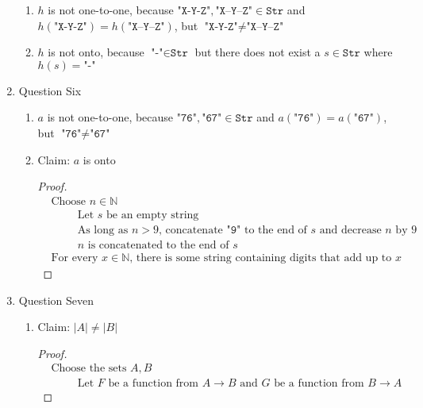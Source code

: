 \documentclass{article}
\begin{document}
\begin{enumerate}
\begin{enumerate}
        \item $h$ is not one-to-one, because $\texttt{"X-Y-Z"}, \texttt{"X--Y--Z"} \in \texttt{Str}$ and $h(\texttt{"X-Y-Z"}) = h(\texttt{"X--Y--Z"})$, but $\texttt{"X-Y-Z"} \neq \texttt{"X--Y--Z"}$
        \item $h$ is not onto, because $\texttt{"-"} \in \texttt{Str}$ but there does not exist a $s \in \texttt{Str}$ where $h(s) = \texttt{"-"}$
    \end{enumerate}
    \item Question Six
    \begin{enumerate}
        \item $a$ is not one-to-one, because $\texttt{"76"},\texttt{"67"} \in \texttt{Str}$ and $a(\texttt{"76"}) = a(\texttt{"67"})$, but $\texttt{"76"} \neq \texttt{"67"}$
        \item Claim: $a$ is onto
        \begin{proof}
            \begin{align}
                &\text{Choose } n \in \mathbb{N} \\
                &\hspace{1cm} \text{Let } s \text{ be an empty string} \\
                &\hspace{1cm} \text{As long as $n > 9$, concatenate $\texttt{"9"}$ to the end of $s$ and decrease $n$ by 9}  \\
                &\hspace{1cm} n \text{ is concatenated to the end of } s \\
                &\text{For every } x \in \mathbb{N} \text{, there is some string containing digits that add up to } x
            \end{align}
        \end{proof}
    \end{enumerate}
    \item Question Seven
    \begin{enumerate}
        \item Claim: $|A| \neq |B|$
        \begin{proof}
            \begin{align}
                &\text{Choose the sets } A,B \\
                &\hspace{1cm} \text{Let $F$ be a function from $A \rightarrow B$ and $G$ be a function from $B \rightarrow A$}
            \end{align}
        \end{proof}
    \end{enumerate}
\end{enumerate}
\end{document}
